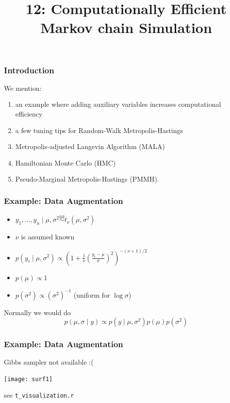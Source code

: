 \documentclass{beamer}
\title["12"]{12: Computationally Efficient Markov chain Simulation}
\begin{document}

\begin{frame}
\titlepage 
\end{frame}

\begin{frame}
\frametitle{Introduction}

We mention:
\begin{enumerate}
\item an example where adding auxiliary variables increases computational efficiency
\item a few tuning tips for Random-Walk Metropolis-Hastings
\item Metropolis-adjusted Langevin Algorithm (MALA)
\item Hamiltonian Monte Carlo (HMC)
\item Pseudo-Marginal Metropolis-Hastings (PMMH).
\end{enumerate}


\end{frame}


\begin{frame}
\frametitle{Example: Data Augmentation}

\begin{itemize}
\item $y_1, \ldots, y_n \mid \mu, \sigma^2 \overset{\text{iid}}{\sim} t_{\nu}(\mu, \sigma^2)$
\item $\nu$ is assumed known
\item $p(y_i \mid \mu, \sigma^2) \propto \left(1 + \frac{1}{\nu}\left(\frac{y_i - \mu}{\sigma} \right)^2 \right)^{-(\nu+1)/2}$
\item $p(\mu) \propto 1$
\item $p(\sigma^2) \propto (\sigma^2)^{-1}$ (uniform for $\log \sigma$)
\end{itemize}
\pause

Normally we would do
$$
p(\mu, \sigma \mid y) \propto p(y \mid \mu, \sigma^2)p(\mu)p(\sigma^2)
$$
\newline

\end{frame}

\begin{frame}[fragile]
\frametitle{Example: Data Augmentation}

Gibbs sampler not available :( 

\begin{center}
\texttt{[image: surf1]}
\end{center}
see \verb|t_visualization.r|

\end{frame}
\end{document}
